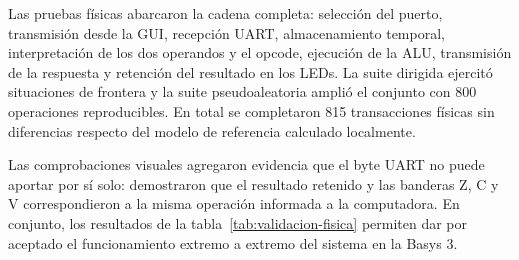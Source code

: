 Las pruebas físicas abarcaron la cadena completa: selección del
puerto, transmisión desde la GUI, recepción UART, almacenamiento
temporal, interpretación de los dos operandos y el opcode, ejecución de la ALU,
transmisión de la respuesta y retención del resultado en los LEDs. La
suite dirigida ejercitó situaciones de frontera y la suite
pseudoaleatoria amplió el conjunto con 800 operaciones reproducibles.
En total se completaron 815 transacciones físicas sin diferencias
respecto del modelo de referencia calculado localmente.

Las comprobaciones visuales agregaron evidencia que el byte UART no
puede aportar por sí solo: demostraron que el resultado retenido y
las banderas Z, C y V correspondieron a la misma operación informada
a la computadora. En conjunto, los resultados de la
tabla~\ref{tab:validacion-fisica} permiten dar por aceptado el
funcionamiento extremo a extremo del sistema en la Basys 3.
